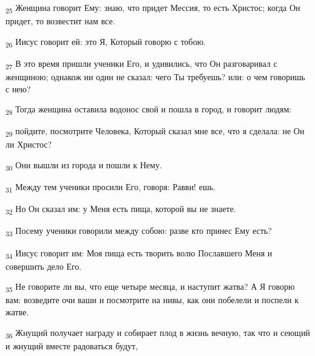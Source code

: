 \begin{tcolorbox}
\textsubscript{25} Женщина говорит Ему: знаю, что придет Мессия, то есть Христос; когда Он придет, то возвестит нам все.
\end{tcolorbox}
\begin{tcolorbox}
\textsubscript{26} Иисус говорит ей: это Я, Который говорю с тобою.
\end{tcolorbox}
\begin{tcolorbox}
\textsubscript{27} В это время пришли ученики Его, и удивились, что Он разговаривал с женщиною; однакож ни один не сказал: чего Ты требуешь? или: о чем говоришь с нею?
\end{tcolorbox}
\begin{tcolorbox}
\textsubscript{28} Тогда женщина оставила водонос свой и пошла в город, и говорит людям:
\end{tcolorbox}
\begin{tcolorbox}
\textsubscript{29} пойдите, посмотрите Человека, Который сказал мне все, что я сделала: не Он ли Христос?
\end{tcolorbox}
\begin{tcolorbox}
\textsubscript{30} Они вышли из города и пошли к Нему.
\end{tcolorbox}
\begin{tcolorbox}
\textsubscript{31} Между тем ученики просили Его, говоря: Равви! ешь.
\end{tcolorbox}
\begin{tcolorbox}
\textsubscript{32} Но Он сказал им: у Меня есть пища, которой вы не знаете.
\end{tcolorbox}
\begin{tcolorbox}
\textsubscript{33} Посему ученики говорили между собою: разве кто принес Ему есть?
\end{tcolorbox}
\begin{tcolorbox}
\textsubscript{34} Иисус говорит им: Моя пища есть творить волю Пославшего Меня и совершить дело Его.
\end{tcolorbox}
\begin{tcolorbox}
\textsubscript{35} Не говорите ли вы, что еще четыре месяца, и наступит жатва? А Я говорю вам: возведите очи ваши и посмотрите на нивы, как они побелели и поспели к жатве.
\end{tcolorbox}
\begin{tcolorbox}
\textsubscript{36} Жнущий получает награду и собирает плод в жизнь вечную, так что и сеющий и жнущий вместе радоваться будут,
\end{tcolorbox}
